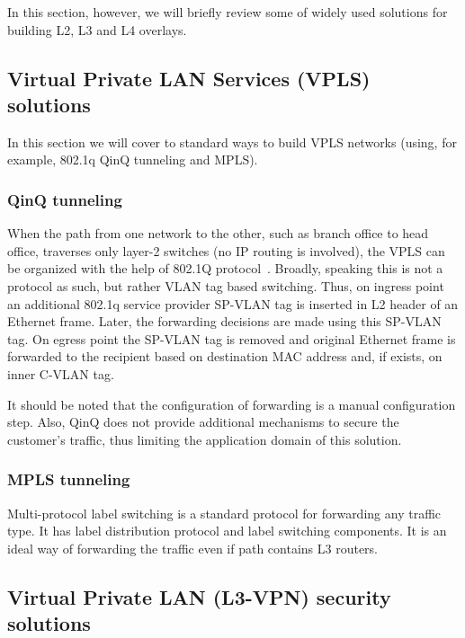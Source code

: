 In this section, however, we will briefly review some of widely used solutions 
for building L2, L3 and L4 overlays.

\subsection{Virtual Private LAN Services (VPLS) solutions}

In this section we will cover 
to standard ways to build VPLS networks (using, for example, 802.1q QinQ tunneling and MPLS).

\subsubsection{QinQ tunneling}

When the path from one network to the other, such as branch office to head office,
traverses only layer-2 switches (\ie no IP routing is involved), the VPLS can be organized 
with the help of 802.1Q protocol~\cite{snr}. Broadly, speaking this is not a protocol as such, but rather 
VLAN tag based switching. Thus, on ingress point an additional 802.1q service provider SP-VLAN tag 
is inserted in L2 header of an Ethernet frame. Later, the forwarding decisions are 
made using this SP-VLAN tag. On egress point the SP-VLAN tag is removed and original 
Ethernet frame is forwarded to the recipient based on destination MAC address 
and, if exists, on inner C-VLAN tag. 

It should be noted that the configuration of forwarding is a manual configuration step.
Also, QinQ does not provide additional mechanisms to secure the customer's traffic,
thus limiting the application domain of this solution.

\subsubsection{MPLS tunneling}

Multi-protocol label switching is a standard protocol for forwarding any traffic type.
It has label distribution protocol and label switching components. It is an ideal way 
of forwarding the traffic even if path contains L3 routers.

\subsection{Virtual Private LAN (L3-VPN) security solutions}

